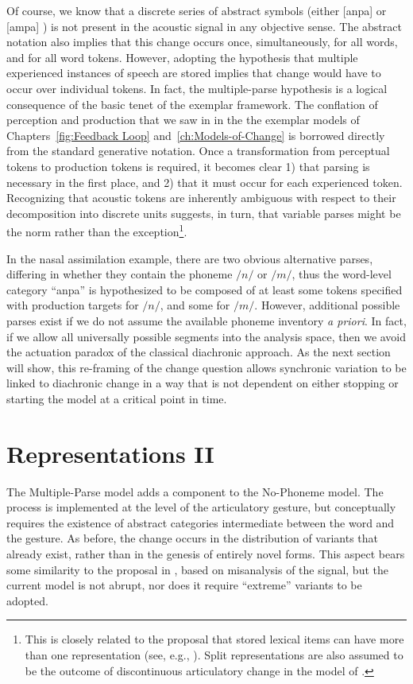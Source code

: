 Of course, we know that a discrete series of abstract symbols (either
{[anpa]} or {[ampa]} ) is not present in the acoustic
signal in any objective sense. The abstract notation also implies
that this change occurs once, simultaneously, for all words, and for
all word tokens. However, adopting the hypothesis that multiple experienced
instances of speech are stored implies that change would have to occur
over individual tokens. In fact, the multiple-parse hypothesis is
a logical consequence of the basic tenet of the exemplar framework.
The conflation of perception and production that we saw in in the
the exemplar models of Chapters~\ref{fig:Feedback Loop} and~\ref{ch:Models-of-Change}
is borrowed directly from the standard generative notation. Once a
transformation from perceptual tokens to production tokens is required,
it becomes clear 1) that parsing is necessary in the first place,
and 2) that it must occur for each experienced token. Recognizing
that acoustic tokens are inherently ambiguous with respect to their
decomposition into discrete units suggests, in turn, that variable
parses might be the norm rather than the exception\footnote{This is closely related to the proposal that stored lexical items
can have more than one representation (see, e.g., \citealp{hooper1976word,Janda2008,Bybee2001}).
Split representations are also assumed to be the outcome of discontinuous
articulatory change in the model of \citet{Garrett2013}.}. 

In the nasal assimilation example, there are two obvious alternative
parses, differing in whether they contain the phoneme $/n/$ or $/m/$,
thus the word-level category “anpa” is hypothesized to be composed
of at least some tokens specified with production targets for $/n/$,
and some for $/m/$. However, additional possible parses exist if
we do not assume the available phoneme inventory \emph{a priori}.
In fact, if we allow all universally possible segments into the analysis
space, then we avoid the actuation paradox of the classical diachronic
approach. As the next section will show, this re-framing of the change
question allows synchronic variation to be linked to diachronic change
in a way that is not dependent on either stopping or starting the
model at a critical point in time. 

\section{Representations II}

The Multiple-Parse model adds a  component to the No-Phoneme
model. The process is implemented at the level of the articulatory
gesture, but conceptually requires the existence of abstract categories
intermediate between the word and the gesture. As before, the change
occurs in the distribution of variants that already exist, rather
than in the genesis of entirely novel forms. This aspect bears some
similarity to the proposal in \citet{Baker2011}, based on misanalysis
of the signal, but the current model is not abrupt, nor does it require
“extreme” variants to be adopted.

